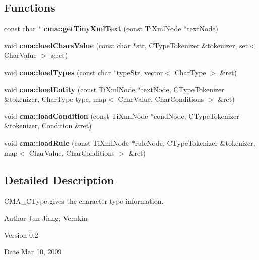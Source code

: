 \subsection*{Functions}
\begin{DoxyCompactItemize}
\item 
const char $\ast$ {\bfseries cma::getTinyXmlText} (const TiXmlNode $\ast$textNode)\label{namespacecma_a9e262f7d98782e77249652852109952a}

\item 
void {\bfseries cma::loadCharsValue} (const char $\ast$str, CTypeTokenizer \&tokenizer, set$<$ CharValue $>$ \&ret)\label{namespacecma_aab115ac8f5f6e8aa470f025bf114773b}

\item 
void {\bf cma::loadTypes} (const char $\ast$typeStr, vector$<$ CharType $>$ \&ret)
\item 
void {\bfseries cma::loadEntity} (const TiXmlNode $\ast$textNode, CTypeTokenizer \&tokenizer, CharType type, map$<$ CharValue, CharConditions $>$ \&ret)\label{namespacecma_aa633d17ab2db100f6da72cf5736f8d45}

\item 
void {\bfseries cma::loadCondition} (const TiXmlNode $\ast$condNode, CTypeTokenizer \&tokenizer, Condition \&ret)\label{namespacecma_afc9de2d3ab1659aa8e628b95a490270e}

\item 
void {\bfseries cma::loadRule} (const TiXmlNode $\ast$ruleNode, CTypeTokenizer \&tokenizer, map$<$ CharValue, CharConditions $>$ \&ret)\label{namespacecma_afa2a411436584a8e37139dffd9f44c1a}

\end{DoxyCompactItemize}


\subsection{Detailed Description}
CMA\_\-CType gives the character type information. \begin{DoxyAuthor}{Author}
Jun Jiang, Vernkin 
\end{DoxyAuthor}
\begin{DoxyVersion}{Version}
0.2 
\end{DoxyVersion}
\begin{DoxyDate}{Date}
Mar 10, 2009 
\end{DoxyDate}
